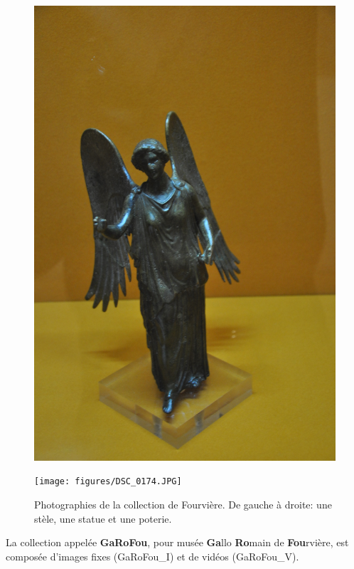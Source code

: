 \begin{figure}[htb]
\begin{minipage}[c]{.2\linewidth}
   \end{minipage}
   \begin{minipage}[c]{.2\linewidth}
      \includegraphics[width=\linewidth]{figures/A_019_00.jpg}
   \end{minipage}
   \begin{minipage}[c]{.2\linewidth}
      \texttt{[image: figures/DSC\_0174.JPG]}
   \end{minipage}
    \caption{Photographies de la collection de Fourvière. De gauche à droite: une stèle, une statue et une poterie.}
  	\label{fig:exempleFourviere}
\end{figure}

La collection appelée {\bf GaRoFou}, pour musée {\bf Ga}llo {\bf Ro}main de {\bf Fou}rvière, est composée d'images fixes (GaRoFou\_I) et de vidéos (GaRoFou\_V).

